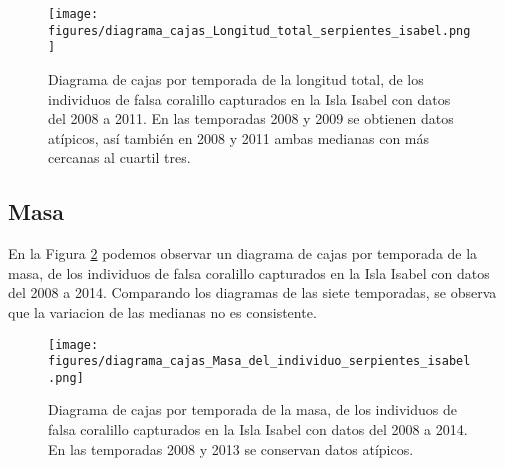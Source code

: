 \documentclass{article}
\begin{document}
\begin{figure}[H]
\centering
\caption{Diagrama de cajas por temporada de la longitud total, de los individuos de falsa coralillo capturados en la Isla Isabel con datos del 2008 a 2011. En las temporadas 2008 y 2009 se obtienen datos atípicos, así también en 2008 y 2011 ambas medianas con más cercanas al cuartil tres.}
\label{fig:pngBoxsplotLongitudTotal}
\texttt{[image: figures/diagrama\_cajas\_Longitud\_total\_serpientes\_isabel.png]}
\end{figure}

\subsection*{Masa}
En la Figura \ref{fig:pngBoxsplotMasa} podemos observar un diagrama de cajas por
temporada de la masa, de los individuos de falsa coralillo capturados en la Isla
Isabel con datos del 2008 a 2014. Comparando los diagramas de las siete temporadas, se observa  que
la variacion de las medianas no es consistente.

\begin{figure}[H]
\centering
\caption{Diagrama de cajas por temporada de la masa, de los individuos de falsa coralillo capturados en la Isla Isabel con datos del 2008 a 2014. En las temporadas 2008 y 2013 se conservan datos atípicos.}
\label{fig:pngBoxsplotMasa}
\texttt{[image: figures/diagrama\_cajas\_Masa\_del\_individuo\_serpientes\_isabel.png]}
\end{figure}
\end{document}

